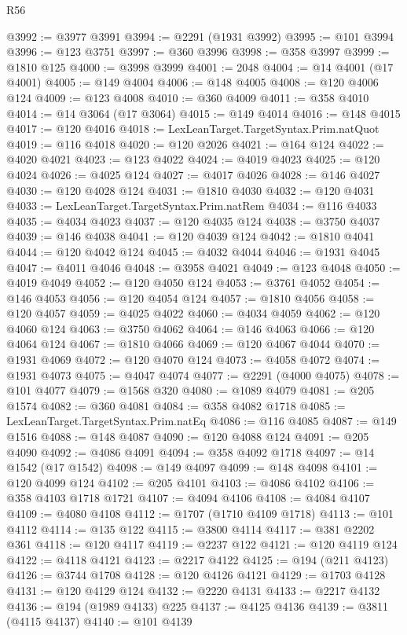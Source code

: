 \begin{lexlean}{R56}
\begin{coremodule}
@3992 := @3977 @3991
@3994 := @2291 (@1931 @3992)
@3995 := @101 @3994
@3996 := @123 @3751
@3997 := @360 @3996
@3998 := @358 @3997
@3999 := @1810 @125
@4000 := @3998 @3999
@4001 := 2048
@4004 := @14 @4001 (@17 @4001)
@4005 := @149 @4004
@4006 := @148 @4005
@4008 := @120 @4006 @124
@4009 := @123 @4008
@4010 := @360 @4009
@4011 := @358 @4010
@4014 := @14 @3064 (@17 @3064)
@4015 := @149 @4014
@4016 := @148 @4015
@4017 := @120 @4016
@4018 := LexLeanTarget.TargetSyntax.Prim.natQuot
@4019 := @116 @4018
@4020 := @120 @2026
@4021 := @164 @124
@4022 := @4020 @4021
@4023 := @123 @4022
@4024 := @4019 @4023
@4025 := @120 @4024
@4026 := @4025 @124
@4027 := @4017 @4026
@4028 := @146 @4027
@4030 := @120 @4028 @124
@4031 := @1810 @4030
@4032 := @120 @4031
@4033 := LexLeanTarget.TargetSyntax.Prim.natRem
@4034 := @116 @4033
@4035 := @4034 @4023
@4037 := @120 @4035 @124
@4038 := @3750 @4037
@4039 := @146 @4038
@4041 := @120 @4039 @124
@4042 := @1810 @4041
@4044 := @120 @4042 @124
@4045 := @4032 @4044
@4046 := @1931 @4045
@4047 := @4011 @4046
@4048 := @3958 @4021
@4049 := @123 @4048
@4050 := @4019 @4049
@4052 := @120 @4050 @124
@4053 := @3761 @4052
@4054 := @146 @4053
@4056 := @120 @4054 @124
@4057 := @1810 @4056
@4058 := @120 @4057
@4059 := @4025 @4022
@4060 := @4034 @4059
@4062 := @120 @4060 @124
@4063 := @3750 @4062
@4064 := @146 @4063
@4066 := @120 @4064 @124
@4067 := @1810 @4066
@4069 := @120 @4067 @4044
@4070 := @1931 @4069
@4072 := @120 @4070 @124
@4073 := @4058 @4072
@4074 := @1931 @4073
@4075 := @4047 @4074
@4077 := @2291 (@4000 @4075)
@4078 := @101 @4077
@4079 := @1568 @320
@4080 := @1089 @4079
@4081 := @205 @1574
@4082 := @360 @4081
@4084 := @358 @4082 @1718
@4085 := LexLeanTarget.TargetSyntax.Prim.natEq
@4086 := @116 @4085
@4087 := @149 @1516
@4088 := @148 @4087
@4090 := @120 @4088 @124
@4091 := @205 @4090
@4092 := @4086 @4091
@4094 := @358 @4092 @1718
@4097 := @14 @1542 (@17 @1542)
@4098 := @149 @4097
@4099 := @148 @4098
@4101 := @120 @4099 @124
@4102 := @205 @4101
@4103 := @4086 @4102
@4106 := @358 @4103 @1718 @1721
@4107 := @4094 @4106
@4108 := @4084 @4107
@4109 := @4080 @4108
@4112 := @1707 (@1710 @4109 @1718)
@4113 := @101 @4112
@4114 := @135 @122
@4115 := @3800 @4114
@4117 := @381 @2202 @361
@4118 := @120 @4117
@4119 := @2237 @122
@4121 := @120 @4119 @124
@4122 := @4118 @4121
@4123 := @2217 @4122
@4125 := @194 (@211 @4123)
@4126 := @3744 @1708
@4128 := @120 @4126 @4121
@4129 := @1703 @4128
@4131 := @120 @4129 @124
@4132 := @2220 @4131
@4133 := @2217 @4132
@4136 := @194 (@1989 @4133) @225
@4137 := @4125 @4136
@4139 := @3811 (@4115 @4137)
@4140 := @101 @4139

\end{coremodule}
\end{lexlean}
